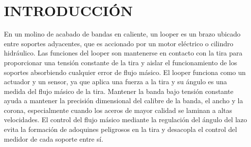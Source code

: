 %
%
%
%
%
%
%
%
%

\section{INTRODUCCIÓN}
En un molino de acabado de bandas en caliente, un looper es un brazo ubicado entre soportes adyacentes, que es accionado por un motor eléctrico o cilindro hidráulico. Las funciones del looper son mantenerse en contacto con la tira para proporcionar una tensión constante de la tira y aislar el funcionamiento de los soportes absorbiendo cualquier error de flujo másico. El looper funciona como un actuador y un sensor, ya que aplica una fuerza a la tira y su ángulo es una medida del flujo másico de la tira. Mantener la banda bajo tensión constante ayuda a mantener la precisión dimensional del calibre de la banda, el ancho y la corona, especialmente cuando los aceros de mayor calidad se laminan a altas velocidades. El control del flujo másico mediante la regulación del ángulo del lazo evita la formación de adoquines peligrosos en la tira y desacopla el control del medidor de cada soporte entre sí.

